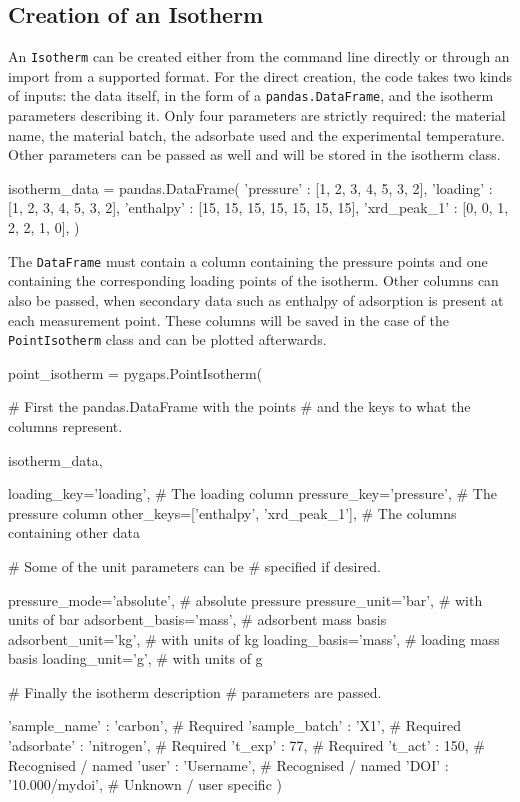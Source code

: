 \subsection{Creation of an Isotherm}

An \texttt{Isotherm} can be created either from the command line 
directly or through an import from a supported format. For the direct
creation, the code takes
two kinds of inputs: the data itself, in the form of a 
\texttt{pandas.DataFrame}, and the isotherm parameters describing it.
Only four parameters are strictly required:
the material name, the material batch, the adsorbate used and the 
experimental temperature. Other parameters can be passed as well 
and will be stored in the isotherm class.

\begin{python}[caption={Creating the \texttt{DataFrame}},%
    label={pyg:lst:isodata}]
isotherm_data = pandas.DataFrame({
    'pressure' : [1, 2, 3, 4, 5, 3, 2],
    'loading' : [1, 2, 3, 4, 5, 3, 2],
    'enthalpy' : [15, 15, 15, 15, 15, 15, 15],
    'xrd_peak_1' : [0, 0, 1, 2, 2, 1, 0],
})
\end{python}

The \texttt{DataFrame} must contain a column containing the pressure
points and one containing the corresponding loading points of the 
isotherm. Other columns can also be passed, when
secondary data such as enthalpy of adsorption is present at 
each measurement point. These columns will be saved in the case of
the \texttt{PointIsotherm} class and can be
plotted afterwards.

\begin{python}[float=htb, caption=Creating the \texttt{PointIsotherm},
    label={pyg:lst:isocreation}]
point_isotherm = pygaps.PointIsotherm(

    # First the pandas.DataFrame with the points
    # and the keys to what the columns represent.

    isotherm_data,

    loading_key='loading',          # The loading column
    pressure_key='pressure',        # The pressure column
    other_keys=['enthalpy',
                'xrd_peak_1'],      # The columns containing other data

    # Some of the unit parameters can be 
    # specified if desired.

    pressure_mode='absolute',       # absolute pressure
    pressure_unit='bar',            # with units of bar
    adsorbent_basis='mass',         # adsorbent mass basis
    adsorbent_unit='kg',            # with units of kg
    loading_basis='mass',           # loading mass basis
    loading_unit='g',               # with units of g

    # Finally the isotherm description
    # parameters are passed.

    'sample_name' : 'carbon',       # Required
    'sample_batch' : 'X1',          # Required
    'adsorbate' : 'nitrogen',       # Required
    't_exp' : 77,                   # Required
    't_act' : 150,                  # Recognised / named
    'user'  : 'Username',           # Recognised / named
    'DOI'   : '10.000/mydoi',       # Unknown / user specific
)
\end{python}

